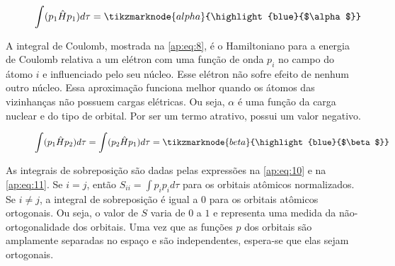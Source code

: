 \begin{figure}[htb]
    \vspace{2\baselineskip}
\begin{equation}
\label{ap:eq:8}
    \displaystyle \int (p_1 \hat{H} p_1) d\tau = \tikzmarknode{alpha}{\highlight{blue}{$\alpha$}} \\
\end{equation}
\end{figure}

A integral de Coulomb, mostrada na \autoref{ap:eq:8}, é o Hamiltoniano para a energia de Coulomb relativa a um elétron com uma função de onda $p_i$ no campo do átomo $i$ e influenciado pelo seu núcleo. Esse elétron não sofre efeito de nenhum outro núcleo. Essa aproximação funciona melhor quando os átomos das vizinhanças não possuem cargas elétricas. Ou seja, $\alpha$ é uma função da carga nuclear e do tipo de orbital. Por ser um termo atrativo, possui um valor negativo. 

\begin{figure}[htb]
    \vspace{2\baselineskip}
\begin{equation}
\label{ap:eq:9}
    \displaystyle \int (p_1 \hat{H} p_2) d\tau = \displaystyle \int (p_2 \hat{H} p_1) d\tau = \tikzmarknode{beta}{\highlight{blue}{$\beta$}}
\end{equation}
\end{figure}

As integrais de sobreposição são dadas pelas expressões na \autoref{ap:eq:10} e na \autoref{ap:eq:11}. Se $i=j$, então $S_{ii} = \displaystyle \int p_i p_i d \tau$ para os orbitais atômicos normalizados. Se $i \neq j $, a integral de sobreposição é igual a $0$ para os orbitais atômicos ortogonais. Ou seja, o valor de $S$ varia de $0$ a $1$ e representa uma medida da não-ortogonalidade dos orbitais. Uma vez que as funções $p$ dos orbitais são amplamente separadas no espaço e são independentes, espera-se que elas sejam ortogonais.

